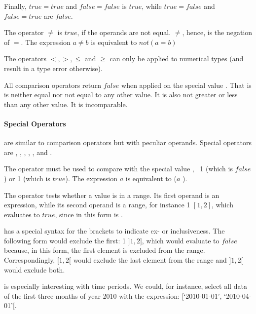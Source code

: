 Finally, $true = true$ and
$false = false$ is $true$, while
$true = false$ and $false = true$ are
$false$.

The operator $\neq$ is $true$,
if the operands are not equal.
$\neq$, hence, is the negation
of $=$. The expression $a\neq b$ is equivalent to
$not (a=b)$

The  operators
$<,>,\le$ and $\ge$ can only be applied
to numerical types (and result in a
type error otherwise).

All comparison operators return $false$
when applied on the special value .
That is  is neither equal nor
not equal to any other value. It is also
not greater or less than any other value.
It is incomparable. 

\paragraph{Special Operators}
are similar to comparison operators
but with peculiar operands.
Special operators are
,
,
,
,
,
 and
.


The operator  must be used
to compare with the special value
, \eg\ 1 
(which is $false$) 
or 1 
(which is $true$).
The expression
$a$  is
equivalent to
($a$ ).

The operator  tests
whether a value is in a range.
Its first operand is an expression,
while its second operand is a range,
for instance
1  $[1,2]$,
which evaluates to $true$,
since  in this form is
.

 has a special syntax
for the brackets to indicate
ex- or inclusiveness. The following
form would exclude the first:
1  $]1,2]$,
which would evaluate to $false$
because, in this form, the first
element is excluded from the range.
Correspondingly,
 $[1,2[$
would exclude the last element from the range
and
 $]1,2[$
would exclude both.

 is especially interesting
with time periods. We could, for instance,
select all data of the first three months
of year 2010 with the expression:
 
[`2010-01-01', `2010-04-01'[.

